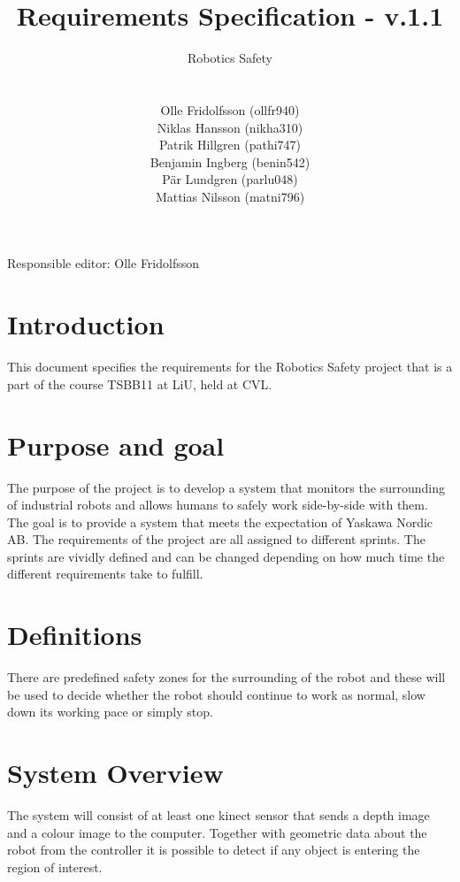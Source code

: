 \documentclass[10pt,a4paper]{article}
\title{Requirements Specification - v.1.1}
\author{\begin{large}{Robotics Safety}\end{large}\\\\
Olle Fridolfsson (ollfr940) \\  Niklas Hansson (nikha310) \\ Patrik Hillgren (pathi747) \\ Benjamin Ingberg (benin542)\\ Pär Lundgren (parlu048) \\ Mattias Nilsson (matni796)}
\begin{document}
\maketitle
\centerline {Responsible editor: Olle Fridolfsson}
\newpage
\tableofcontents
\newpage
\noindent %
\section{Introduction}
This document specifies the requirements for the Robotics Safety project that is a part of the course TSBB11 at LiU, held at CVL.
\section{Purpose and goal}
The purpose of the project is to develop a system that monitors the surrounding of industrial robots and allows humans to safely work side-by-side with them. 
The goal is to provide a system that meets the expectation of Yaskawa Nordic AB.
The requirements of the project are all assigned to different sprints. The sprints are vividly defined and can be changed depending on how much time the different requirements take to fulfill. 

\section{Definitions}
There are predefined safety zones for the surrounding of the robot and these will be used to decide whether the robot should continue to work as normal, slow down its working pace or simply stop.

\section{System Overview}
The system will consist of at least one kinect sensor that sends a depth image and a colour image to the computer. Together with geometric data about the robot from the controller it is possible to detect if any object is entering the region of interest.
\end{document}
